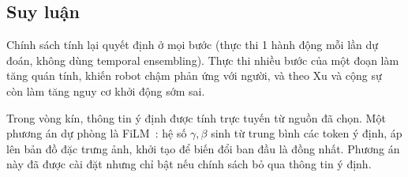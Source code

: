 \subsection{Suy luận}

Chính sách tính lại quyết định ở mọi bước (thực thi 1 hành động mỗi lần dự đoán, không dùng temporal ensembling). Thực thi nhiều bước của một đoạn làm tăng quán tính, khiến robot chậm phản ứng với người, và theo Xu và cộng sự~\cite{xu2026learning} còn làm tăng nguy cơ khởi động sớm sai.

Trong vòng kín, thông tin ý định được tính trực tuyến từ nguồn đã chọn. Một phương án dự phòng là FiLM~\cite{perez2018film}: hệ số $\gamma, \beta$ sinh từ trung bình các token ý định, áp lên bản đồ đặc trưng ảnh, khởi tạo để biến đổi ban đầu là đồng nhất. Phương án này đã được cài đặt nhưng chỉ bật nếu chính sách bỏ qua thông tin ý định.
